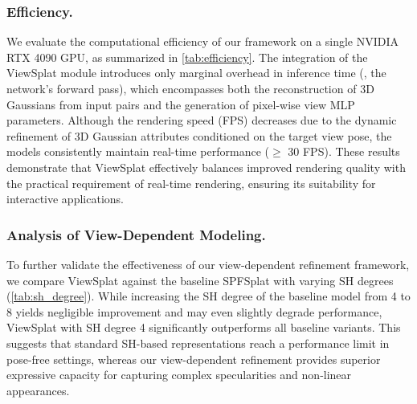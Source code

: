 \documentclass[runningheads]{llncs}
\begin{document}
\vspace{-0.2cm}
\subsubsection{Efficiency.}
We evaluate the computational efficiency of our framework on a single NVIDIA RTX 4090 GPU, as summarized in \cref{tab:efficiency}.
The integration of the ViewSplat module introduces only marginal overhead in inference time (\ie, the network's forward pass), which encompasses both the reconstruction of 3D Gaussians from input pairs and the generation of pixel-wise view MLP parameters.
Although the rendering speed (FPS) decreases due to the dynamic refinement of 3D Gaussian attributes conditioned on the target view pose, the models consistently maintain real-time performance ($\geq$ 30 FPS). These results demonstrate that ViewSplat effectively balances improved rendering quality with the practical requirement of real-time rendering, ensuring its suitability for interactive applications.

\vspace{-0.2cm}
\subsubsection{Analysis of View-Dependent Modeling.}
To further validate the effectiveness of our view-dependent refinement framework, we compare ViewSplat against the baseline SPFSplat with varying SH degrees (\cref{tab:sh_degree}). While increasing the SH degree of the baseline model from 4 to 8 yields negligible improvement and may even slightly degrade performance, ViewSplat with SH degree 4 significantly outperforms all baseline variants. This suggests that standard SH-based representations reach a performance limit in pose-free settings, whereas our view-dependent refinement provides superior expressive capacity for capturing complex specularities and non-linear appearances.
\end{document}
